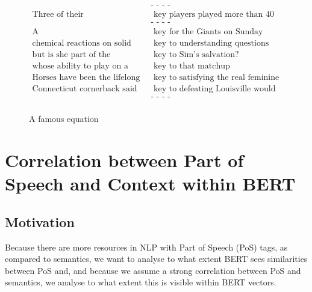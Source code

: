\documentclass[a4paper,12pt,twoside,openright]{report}
\begin{document}
\begin{figure}[H]
\begin{align}
\text{                                                 } & \text{- - - -} \nonumber \\
\text{Three of their} & \text{ key players played more than 40 minutes in Sacramento} \nonumber \\
\text{                                                 } & \text{- - - -} \nonumber \\
\text{A} & \text{ key for the Giants on Sunday} \nonumber \\
\text{chemical reactions on solid surfaces, which are} & \text{ key to understanding questions like why the ozone layer is thinning} \nonumber \\
\text{but is she part of the conspiracy or the} & \text{ key to Sim’s salvation?} \nonumber \\
\text{whose ability to play on a sprained ankle against the Eagles} & \text{ key to that matchup} \nonumber \\
\text{Horses have been the lifelong} & \text{ key to satisfying the real feminine needs for me and my daughter} \nonumber \\
\text{Connecticut cornerback said the} & \text{ key to defeating Louisville would be pressuring Brohm} \nonumber \\
\text{                                                 } & \text{- - - -} \nonumber \\
\end{align}
\caption{A famous equation}
\end{figure}






\section{Correlation between Part of Speech and Context within BERT} \label{correlation_pos_context}

\subsection{Motivation}

Because there are more resources in NLP with Part of Speech (PoS) tags, as compared to semantics, we want to analyse to what extent BERT sees similarities between PoS and, and because we assume a strong correlation between PoS and semantics, we analyse to what extent this is visible within BERT vectors.
\end{document}

